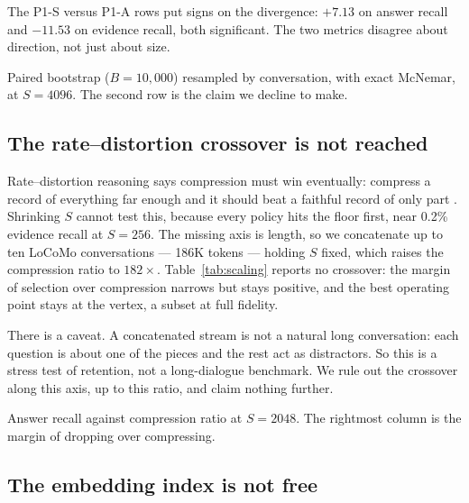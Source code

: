 The P1-S versus P1-A rows put signs on the divergence: $+7.13$ on answer
recall and $-11.53$ on evidence recall, both significant. The two metrics
disagree about direction, not just about size.

\begin{table}[t]
\caption{Paired bootstrap ($B=10{,}000$) resampled by conversation, with exact
McNemar, at $S=4096$. The second row is the claim we decline to make.}
\label{tab:significance}
\centering
\small
\begin{adjustbox}{max width=\textwidth}\end{adjustbox}
\end{table}

\subsection{The rate--distortion crossover is not reached}
\label{sec:scaling}

Rate--distortion reasoning says compression must win eventually: compress a
record of everything far enough and it should beat a faithful record of only
part \cite{colaco2026rd}. Shrinking $S$ cannot test this, because every policy
hits the floor first, near 0.2\% evidence recall at $S=256$. The missing axis is length, so we concatenate up to ten LoCoMo
conversations --- 186K tokens --- holding $S$ fixed, which raises the
compression ratio to $182\times$. Table~\ref{tab:scaling} reports no crossover:
the margin of selection over compression narrows but stays positive, and the best operating
point stays at the vertex, a subset at full fidelity.

There is a caveat. A concatenated stream is not a natural long conversation:
each question is about one of the pieces and the rest act as distractors. So
this is a stress test of retention, not a long-dialogue benchmark. We rule out
the crossover along this axis, up to this ratio, and claim nothing further.

\begin{table}[t]
\caption{Answer recall against compression ratio at $S=2048$. The rightmost
column is the margin of dropping over compressing.}
\label{tab:scaling}
\centering
\small

\end{table}

\subsection{The embedding index is not free}
\label{sec:bytes}

